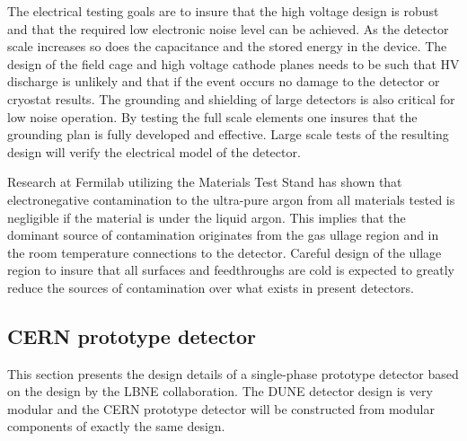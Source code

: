 	 
	 The electrical testing goals are to insure that the high voltage design is robust and that the required low electronic noise level can be achieved. As the detector scale increases so does the capacitance and the stored energy in the device. The design of the field cage and high voltage cathode planes needs to be such that HV discharge is unlikely and that if the event occurs no damage to the detector or cryostat results. The grounding and shielding of large detectors is also critical for low noise operation. By testing the full scale elements one insures that the grounding plan is fully developed and effective. Large scale tests of the resulting design will verify the electrical model of the detector. 

	 Research at Fermilab utilizing the Materials Test Stand has shown that electronegative contamination to the ultra-pure argon from all materials tested is negligible if the material is under the liquid argon. This implies that the dominant source of contamination originates from the gas ullage region and in the room temperature connections to the detector. Careful design of the ullage region to insure that all surfaces and feedthroughs are cold is expected to greatly reduce the sources of contamination over what exists in present detectors. 
	 
\subsection{CERN prototype detector}



This section presents the design details of a single-phase prototype detector based on the design by the LBNE collaboration. 
The DUNE detector design is very modular and the CERN prototype detector will be constructed from modular components of exactly the same design.


